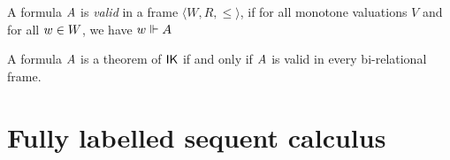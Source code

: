 \documentclass[twoside]{aiml20}
\begin{document}
\begin{definition}
	A formula $A$ is \emph{valid} in a frame $\langle W, R, \le \rangle$, if for all monotone valuations $V$ and for all $w \in W$, we have $w \Vdash A$
\end{definition}


\begin{theorem}\label{thm:plotkin}
	A formula $A$ is a theorem of $\mathsf{IK}$ if and only if $A$ is valid in every bi-relational frame.
\end{theorem}

\section{Fully labelled sequent calculus}\label{sec:labelled}
\end{document}
